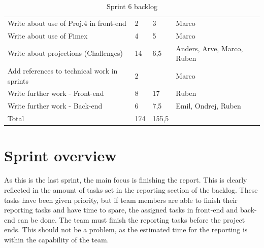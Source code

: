 \documentclass[11pt,a4paper,titlepage,oneside]{report}
\begin{document}
\begin{table}[h]
{\begin{tabular}{llll}
Write about use of Proj.4 in front-end                 & 2                                                                   & 3                                                       & Marco                      \\
Write about use of Fimex                               & 4                                                                   & 5                                                       & Marco                      \\
Write about projections (Challenges)                   & 14                                                                  & 6,5                                                     & Anders, Arve, Marco, Ruben \\
Add references to technical work in sprints            & 2                                                                   &                                                         & Marco                      \\
Write further work - Front-end                         & 8                                                                   & 17                                                      & Ruben                      \\
Write further work - Back-end                          & 6                                                                   & 7,5                                                     & Emil, Ondrej, Ruben        \\
\rowcolor[HTML]{C0C0C0} 
Total                                                  & 174                                                                 & 155,5                                                   &                           
\end{tabular}
}
\caption{Sprint 6 backlog}
\label{tab:Sprint6Backlog}
\end{table}

\section{Sprint overview}
As this is the last sprint, the main focus is finishing the report. This is clearly reflected in the amount of tasks set in the reporting section of the backlog. These tasks have been given priority, but if team members are able to finish their reporting tasks and have time to spare, the assigned tasks in \gls{front-end} and \gls{back-end} can be done. The team must finish the reporting tasks before the project ends. This should not be a problem, as the estimated time for the reporting is within the capability of the team.
\end{document}
